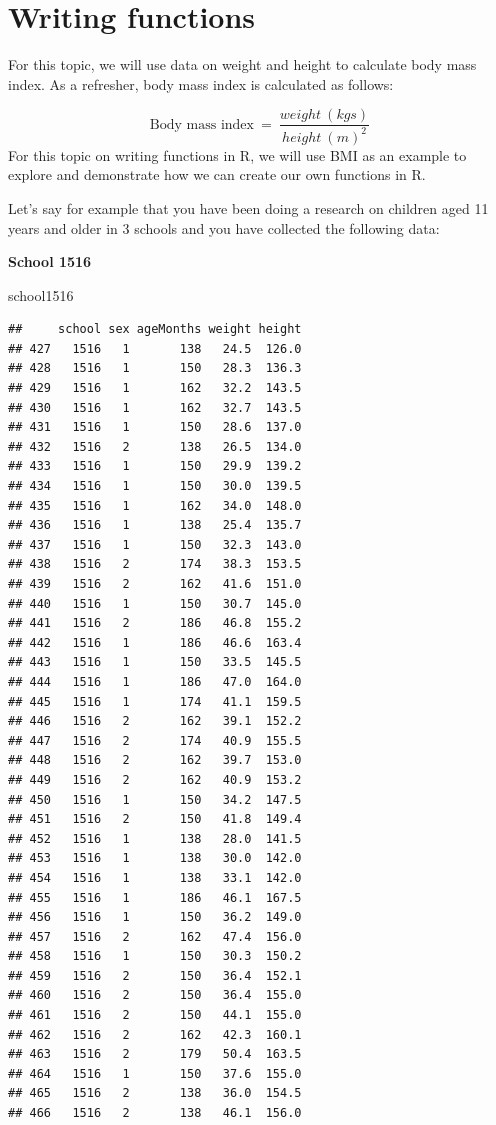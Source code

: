 \documentclass[
  12pt,
]{book}
\newenvironment{Shaded}{\begin{snugshade}}{\end{snugshade}}
\newcommand{\NormalTok}[1]{#1}
\begin{document}
\hypertarget{write-functions}{%
\chapter{Writing functions}\label{write-functions}}

For this topic, we will use data on weight and height to calculate body mass index. As a refresher, body mass index is calculated as follows:

\[ \text{Body mass index} ~=~ \frac{weight ~ (kgs)}{height ~ (m) ^ 2} \]
For this topic on writing functions in R, we will use BMI as an example to explore and demonstrate how we can create our own functions in R.

Let's say for example that you have been doing a research on children aged 11 years and older in 3 schools and you have collected the following data:

\textbf{School 1516}

\begin{Shaded}
\begin{Highlighting}[]
\NormalTok{school1516}
\end{Highlighting}
\end{Shaded}

\begin{verbatim}
##     school sex ageMonths weight height
## 427   1516   1       138   24.5  126.0
## 428   1516   1       150   28.3  136.3
## 429   1516   1       162   32.2  143.5
## 430   1516   1       162   32.7  143.5
## 431   1516   1       150   28.6  137.0
## 432   1516   2       138   26.5  134.0
## 433   1516   1       150   29.9  139.2
## 434   1516   1       150   30.0  139.5
## 435   1516   1       162   34.0  148.0
## 436   1516   1       138   25.4  135.7
## 437   1516   1       150   32.3  143.0
## 438   1516   2       174   38.3  153.5
## 439   1516   2       162   41.6  151.0
## 440   1516   1       150   30.7  145.0
## 441   1516   2       186   46.8  155.2
## 442   1516   1       186   46.6  163.4
## 443   1516   1       150   33.5  145.5
## 444   1516   1       186   47.0  164.0
## 445   1516   1       174   41.1  159.5
## 446   1516   2       162   39.1  152.2
## 447   1516   2       174   40.9  155.5
## 448   1516   2       162   39.7  153.0
## 449   1516   2       162   40.9  153.2
## 450   1516   1       150   34.2  147.5
## 451   1516   2       150   41.8  149.4
## 452   1516   1       138   28.0  141.5
## 453   1516   1       138   30.0  142.0
## 454   1516   1       138   33.1  142.0
## 455   1516   1       186   46.1  167.5
## 456   1516   1       150   36.2  149.0
## 457   1516   2       162   47.4  156.0
## 458   1516   1       150   30.3  150.2
## 459   1516   2       150   36.4  152.1
## 460   1516   2       150   36.4  155.0
## 461   1516   2       150   44.1  155.0
## 462   1516   2       162   42.3  160.1
## 463   1516   2       179   50.4  163.5
## 464   1516   1       150   37.6  155.0
## 465   1516   2       138   36.0  154.5
## 466   1516   2       138   46.1  156.0
\end{verbatim}
\end{document}
